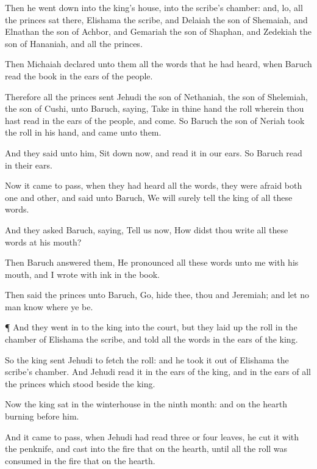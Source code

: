 {Then he went
down into the
king’s
house, into the
scribe’s
chamber: and, lo, all the
princes
sat there,
{}
Elishama the
scribe, and
Delaiah the
son of
Shemaiah, and
Elnathan the
son of
Achbor, and
Gemariah the
son of
Shaphan, and
Zedekiah the
son of
Hananiah, and all the
princes.

Then
Michaiah
declared unto them all the
words that he had
heard, when
Baruch
read the
book in the
ears of the
people.

Therefore all the
princes
sent
Jehudi the
son of
Nethaniah, the
son of
Shelemiah, the
son of
Cushi, unto
Baruch,
saying,
Take in thine
hand the
roll wherein thou hast
read in the
ears of the
people, and
come. So
Baruch the
son of
Neriah
took the
roll in his
hand, and
came unto them.

And they
said unto him, Sit
down now, and
read it in our
ears. So
Baruch
read
{} in their
ears.

Now it came to pass, when they had
heard all the
words, they were
afraid
both
one and
other, and
said unto
Baruch, We will
surely
tell the
king of all these
words.

And they
asked
Baruch,
saying,
Tell us now, How didst thou
write all these
words at his
mouth?

Then
Baruch
answered them, He
pronounced all these
words unto me with his
mouth, and I
wrote
{} with
ink in the
book.

Then
said the
princes unto
Baruch,
Go,
hide thee, thou and
Jeremiah; and let no
man
know
where ye be.


\par }{\PP {}¶ And they went
in to the
king into the
court, but they laid
up the
roll in the
chamber of
Elishama the
scribe, and
told all the
words in the
ears of the
king.

So the
king
sent
Jehudi to
fetch the
roll: and he
took it out of
Elishama the
scribe’s
chamber. And
Jehudi
read it in the
ears of the
king, and in the
ears of all the
princes which
stood
beside the
king.

Now the
king
sat in the
winterhouse in the
ninth
month: and
{} on the
hearth
burning
before him.

And it came to pass,
{} when
Jehudi had
read
three or
four
leaves, he
cut it with the
penknife, and
cast
{} into the
fire that
{} on the
hearth, until all the
roll was
consumed in the
fire that
{} on the
hearth.

}
